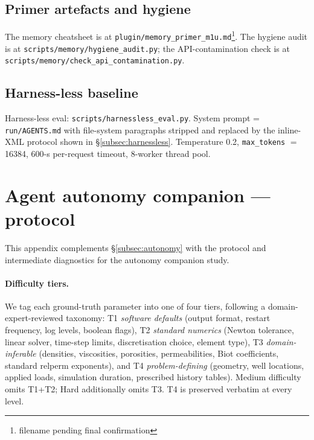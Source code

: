 \documentclass{article}
\begin{document}
\subsection{Primer artefacts and hygiene}
The memory cheatsheet is at \texttt{plugin/memory\_primer\_m1u.md}\footnote{filename pending final confirmation}. The hygiene audit is at \texttt{scripts/memory/hygiene\_audit.py}; the API-contamination check is at \texttt{scripts/memory/check\_api\_contamination.py}.

\subsection{Harness-less baseline}
Harness-less eval: \texttt{scripts/harnessless\_eval.py}. System prompt = \texttt{run/AGENTS.md} with file-system paragraphs stripped and replaced by the inline-XML protocol shown in \S\ref{subsec:harnessless}. Temperature 0.2, \texttt{max\_tokens} $=$ 16384, 600-s per-request timeout, 8-worker thread pool.

\section{Agent autonomy companion --- protocol}
\label{app:autonomy}

This appendix complements \S\ref{subsec:autonomy} with the protocol and intermediate diagnostics for the autonomy companion study.

\paragraph{Difficulty tiers.} We tag each ground-truth parameter into one of four tiers, following a domain-expert-reviewed taxonomy: T1 \emph{software defaults} (output format, restart frequency, log levels, boolean flags), T2 \emph{standard numerics} (Newton tolerance, linear solver, time-step limits, discretisation choice, element type), T3 \emph{domain-inferable} (densities, viscosities, porosities, permeabilities, Biot coefficients, standard relperm exponents), and T4 \emph{problem-defining} (geometry, well locations, applied loads, simulation duration, prescribed history tables). Medium difficulty omits T1+T2; Hard additionally omits T3. T4 is preserved verbatim at every level.
\end{document}
